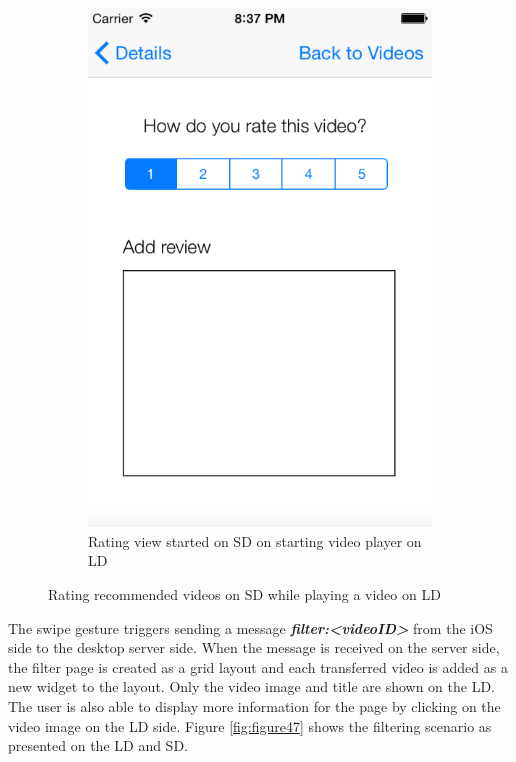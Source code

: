 \begin{figure}
\begin{subfigure}[b]{0.3\textwidth}
        \includegraphics[width=\textwidth]{figures/ratingSD}
        \caption{Rating view started on SD on starting video player on LD}
        \label{fig:figure46b}
    \end{subfigure}
   \caption{Rating recommended videos on SD while playing a video on LD}\label{fig:figure46}
\end{figure}       
The swipe gesture triggers sending a message \textbf{\textit{filter:<videoID>}} from the iOS side to the desktop server side. 
When the message is received on the server side, the filter page is created as a
grid layout and each transferred video is added as a new widget to the layout.
Only the video image and title are shown on the LD. The user is also able to display more information for the page by clicking on the video image on the LD side. Figure \ref{fig:figure47} shows the filtering scenario as presented on the LD and SD.\\

